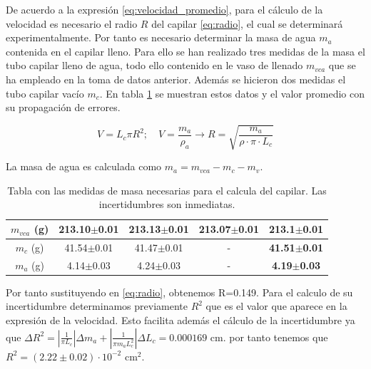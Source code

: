 	
	\vspace{\baselineskip} 
	
	De acuerdo a la expresión \ref{eq:velocidad_promedio}, para el cálculo de la velocidad es necesario el radio $R$ del capilar \ref{eq:radio}, el cual se determinará experimentalmente. Por tanto es necesario determinar la masa de agua $m_a$ contenida en el capilar lleno. Para ello se han realizado tres medidas de  la masa el tubo capilar lleno de agua, todo ello contenido en le vaso de llenado $m_{vca}$ que se ha empleado en la toma de datos anterior. Además se hicieron dos medidas el tubo capilar vacío $m_c$. En tabla \ref{tab:datos_r} se muestran estos datos y el valor promedio con su propagación de errores.
		
	\begin{equation}\label{eq:radio}
		V= L_c\pi R^2;\quad V=\frac{m_a}{\rho_a} \rightarrow R = \sqrt{\frac{m_a}{\rho\cdot \pi \cdot L_c}}
	\end{equation}
	
	
	La masa de agua es calculada como $m_a=m_{vca} - m_c - m_v$.
	
	\begin{table}[H]
		\centering
		\begin{minipage}{0.7\textwidth} 
			\centering
			\begin{tabular}{|c|c|c|c|c|}
				\toprule
				$m_{vca}$ (g) & 213.10$\pm$0.01  & 213.13$\pm$0.01 & 213.07$\pm$0.01 & \textbf{213.1$\pm$0.01}\\
				\hline
				$m_c$ (g) & 41.54$\pm$0.01 & 41.47$\pm$0.01 & - & \textbf{41.51$\pm$0.01} \\
				\hline
				$m_a$ (g) & 4.14$\pm$0.03 & 4.24$\pm$0.03 & - & \textbf{4.19$\pm$0.03} \\
				\bottomrule
			\end{tabular}
			\caption{\footnotesize Tabla con las medidas de masa necesarias para el calcula del capilar. Las incertidumbres son inmediatas.}
			\label{tab:datos_r}
		\end{minipage}
	\end{table}
	
	Por tanto sustituyendo en \ref{eq:radio}, obtenemos R=0.149. Para el calculo de su incertidumbre determinamos previamente $R^2$ que es el valor que aparece en la expresión de la velocidad. Esto facilita además el cálculo de la incertidumbre ya que $\Delta R^2 = \left|\frac{1}{\pi L_c}\right|\Delta m_a + \left|\frac{1}{\pi m_a L_c^2}\right|\Delta L_c = 0.000169$ cm. por tanto tenemos que  $R^2= (2.22\pm0.02)\cdot10^{-2}$ cm$^2$.
	

